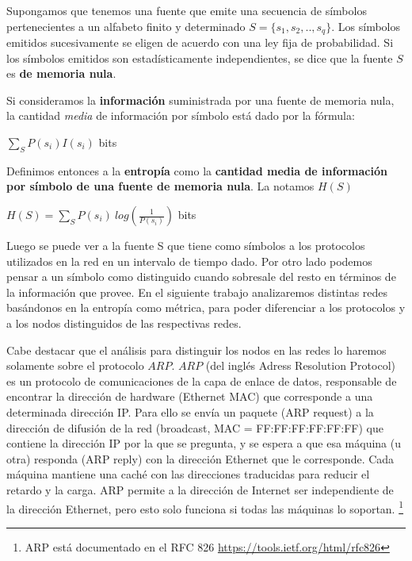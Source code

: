 Supongamos que tenemos una fuente que emite una secuencia de símbolos pertenecientes a un alfabeto finito y determinado $S = \{s_1, s_2, .., s_q\}$. Los símbolos emitidos sucesivamente se eligen de acuerdo con una ley fija de probabilidad. Si los símbolos emitidos son estadísticamente independientes, se dice que la fuente $S$ es \textbf{de memoria nula}.

Si consideramos la \textbf{información} suministrada por una fuente de memoria nula, la cantidad \emph{media} de información por símbolo está dado por la fórmula:
\begin{center}
    $\displaystyle \sum_S P(s_i) I(s_i)$ bits
\end{center}


Definimos entonces a la \textbf{entropía} como la \textbf{cantidad media de información por símbolo de una fuente de memoria nula}. La notamos $H(S)$
\begin{center}
$\displaystyle H(S) = \sum_S P(s_i)\ log(\frac{1}{P(s_i)})$ bits
\end{center}

Luego se puede ver a la fuente S que tiene como símbolos a los protocolos utilizados en la red en un intervalo de tiempo dado.
Por otro lado podemos pensar a un símbolo como distinguido cuando sobresale del resto en términos de la información que provee.
En el siguiente trabajo analizaremos distintas redes basándonos en la entropía como métrica, 
para poder diferenciar a los protocolos y a los nodos distinguidos de las respectivas redes.

Cabe destacar que el análisis para distinguir los nodos en las redes lo haremos solamente sobre el protocolo $ARP$.
$ARP$ (del inglés Adress Resolution Protocol) es un protocolo de comunicaciones de la capa de enlace de datos, responsable de encontrar la dirección de hardware (Ethernet MAC) que corresponde a una determinada dirección IP. Para ello se envía un paquete (ARP request) a la dirección de difusión de la red (broadcast, MAC = FF:FF:FF:FF:FF:FF) que contiene la dirección IP por la que se pregunta, y se espera a que esa máquina (u otra) responda (ARP reply) con la dirección Ethernet que le corresponde. Cada máquina mantiene una caché con las direcciones traducidas para reducir el retardo y la carga. ARP permite a la dirección de Internet ser independiente de la dirección Ethernet, pero esto solo funciona si todas las máquinas lo soportan.
 \footnote{ARP está documentado en el RFC 826 \url{https://tools.ietf.org/html/rfc826}}
